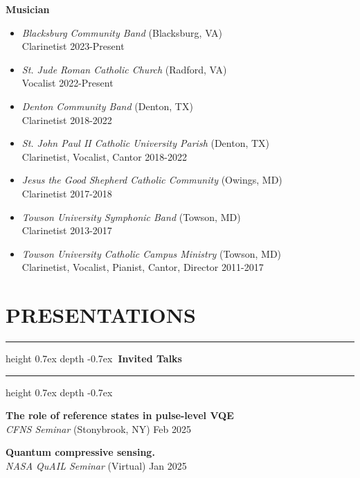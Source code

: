 \documentclass[marginmode, 10pt]{res} %
\def\Vhrulefill{\leavevmode\leaders\hrule height 0.7ex depth \dimexpr0.4pt-0.7ex\hfill\kern0pt}         %
\begin{document}
\begin{resume}
\textbf{Musician}
\begin{itemize}
    \item \textit{Blacksburg Community Band} (Blacksburg, VA) \\
    Clarinetist \hfill 2023-Present
    \item \textit{St. Jude Roman Catholic Church} (Radford, VA) \\
    Vocalist \hfill 2022-Present
    \item \textit{Denton Community Band} (Denton, TX) \\
    Clarinetist \hfill 2018-2022
    \item \textit{St. John Paul II Catholic University Parish} (Denton, TX) \\
    Clarinetist, Vocalist, Cantor \hfill 2018-2022
    \item \textit{Jesus the Good Shepherd Catholic Community} (Owings, MD) \\
    Clarinetist \hfill 2017-2018
    \item \textit{Towson University Symphonic Band} (Towson, MD) \\
    Clarinetist \hfill 2013-2017
    \item \textit{Towson University Catholic Campus Ministry} (Towson, MD) \\
    Clarinetist, Vocalist, Pianist, Cantor, Director \hfill 2011-2017
\end{itemize}




\pagebreak

\section{\small{PRESENTATIONS}}

\Vhrulefill \textbf{~Invited Talks~} \Vhrulefill

\textbf{The role of reference states in pulse-level VQE} \\
    \textit{CFNS Seminar} (Stonybrook, NY) \hfill Feb 2025

\textbf{Quantum compressive sensing.} \\
    \textit{NASA QuAIL Seminar} (Virtual) \hfill Jan 2025


\end{resume}
\end{document}
